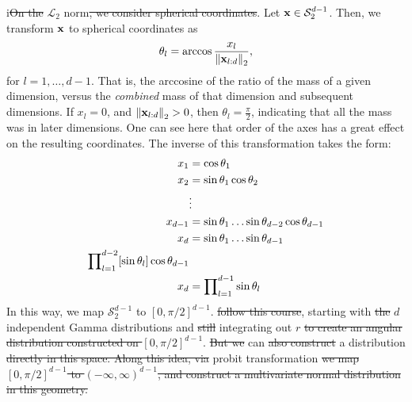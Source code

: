 i\st{On the} $\mathcal{L}_2$ norm\st{, we consider spherical coordinates}.  Let ${\bf x} \in \mathcal{S}_{2}^{d-1}$.
  Then, we transform ${\bf x}$ to spherical coordinates as
  \begin{equation*}
    \theta_l = \arccos\frac{x_l}{\left\lVert {\bf x}_{l:d} \right\rVert_{2}},
  \end{equation*}
  for $l = 1,\ldots, d-1$. That is, the arccosine of the ratio of the mass of a given dimension,
  versus the \emph{combined} mass of that dimension and subsequent dimensions.  If $x_l = 0$, and
  $\left\lVert {\bf x}_{l:d} \right\rVert_{2} > 0$, then $\theta_l = \frac{\pi}{2}$, indicating that all the mass was
  in later dimensions.  One can see here that order of the axes has a great effect on the resulting
  coordinates.  The inverse of this transformation takes the form:
  \begin{equation}
    \label{eqn:spherical}
    \begin{aligned}
      x_1 &= \cos\theta_1\\
      x_2 &= \sin\theta_1\cos\theta_2\\
      &\vdots\\
      x_{d-1} &= \sin\theta_1\ldots\sin\theta_{d-2}\cos\theta_{d-1}\\
      x_d &= \sin\theta_1\ldots\sin\theta_{d-1}\\
      {\small \prod}_{l = 1}^{d-2}[\sin\theta_{l}]\cos\theta_{d-1}\\
      x_d &= {\small \prod}_{l = 1}^{d-1}\sin\theta_l
    \end{aligned}
  \end{equation}
  In this way, we map $\mathcal{S}_2^{d-1}$ to $[0,\pi/2]^{d-1}$.
  \cite{nunez2019} 
  \st{follow this course}, starting with \st{the} $d$ independent Gamma distributions and \st{still} integrating out
  $r$ \st{to create an angular distribution constructed on $[0,\pi/2]^{d-1}$}. \st{But we}  can \st{also construct} 
  a distribution  \st{directly in this space.  Along this idea, via} probit transformation  \st{we map
  $[0,\pi/2]^{d-1}$ to $(-\infty, \infty)^{d-1}$, and construct a multivariate normal distribution
  in this geometry.}

